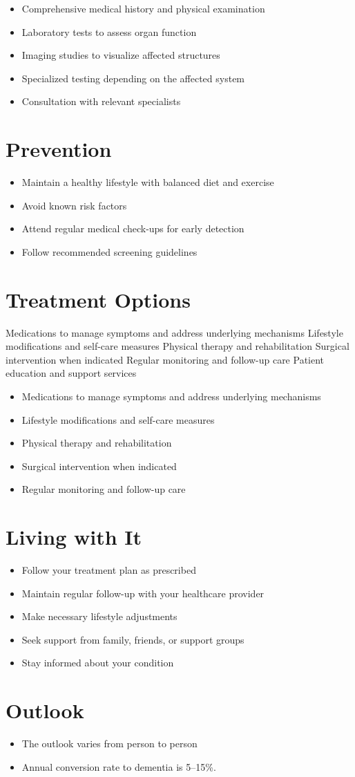 \begin{itemize}[noitemsep]
  \item Comprehensive medical history and physical examination
  \item Laboratory tests to assess organ function
  \item Imaging studies to visualize affected structures
  \item Specialized testing depending on the affected system
  \item Consultation with relevant specialists
\end{itemize}
\section{Prevention}
\begin{itemize}[noitemsep]
  \item Maintain a healthy lifestyle with balanced diet and exercise
  \item Avoid known risk factors
  \item Attend regular medical check-ups for early detection
  \item Follow recommended screening guidelines
\end{itemize}
\section{Treatment Options}
Medications to manage symptoms and address underlying mechanisms Lifestyle modifications and self-care measures Physical therapy and rehabilitation Surgical intervention when indicated Regular monitoring and follow-up care Patient education and support services

\begin{itemize}[noitemsep]
  \item Medications to manage symptoms and address underlying mechanisms
  \item Lifestyle modifications and self-care measures
  \item Physical therapy and rehabilitation
  \item Surgical intervention when indicated
  \item Regular monitoring and follow-up care
\end{itemize}
\section{Living with It}
\begin{itemize}[noitemsep]
  \item Follow your treatment plan as prescribed
  \item Maintain regular follow-up with your healthcare provider
  \item Make necessary lifestyle adjustments
  \item Seek support from family, friends, or support groups
  \item Stay informed about your condition
\end{itemize}
\section{Outlook}
\begin{itemize}[noitemsep]
  \item The outlook varies from person to person
  \item Annual conversion rate to dementia is 5--15\%.
\end{itemize}
